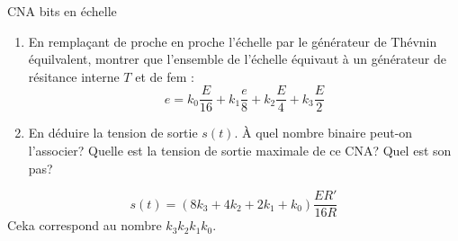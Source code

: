 \documentclass[french, a4paper, 11pt]{article}
\newcommand{\po}{\left(}         %
\newcommand{\pf}{\right)}        %
\newcommand{\pof}[1]{\po #1 \pf} %
\begin{document}
\begin{cadre}{CNA bits en échelle}
  \begin{enumerate}[label=\upshape\alph*)]
    \item En remplaçant de proche en proche l'échelle par le générateur de Thévnin équilvalent, montrer que l'ensemble de l'échelle équivaut à un générateur de résitance interne \(T\) et de fem :
   \[e=k_{0}\dfrac{E}{16}+k_{1}\dfrac{e}{8}+k_2\dfrac{E}{4}+k_{3}\dfrac{E}{2}\]
    \item En déduire la tension de sortie \(s(t)\). À quel nombre binaire peut-on l'associer? Quelle est la tension de sortie maximale de ce CNA? Quel est son pas?
  \end{enumerate}
  \tcblower
  \[s(t)=\pof{8k_{3}+4k_{2}+2k_{1}+k_{0}}\dfrac{ER'}{16R}\]
  Ceka correspond au nombre \(k_{3}k_{2}k_{1}k_{0}\).
\end{cadre}
\end{document}
